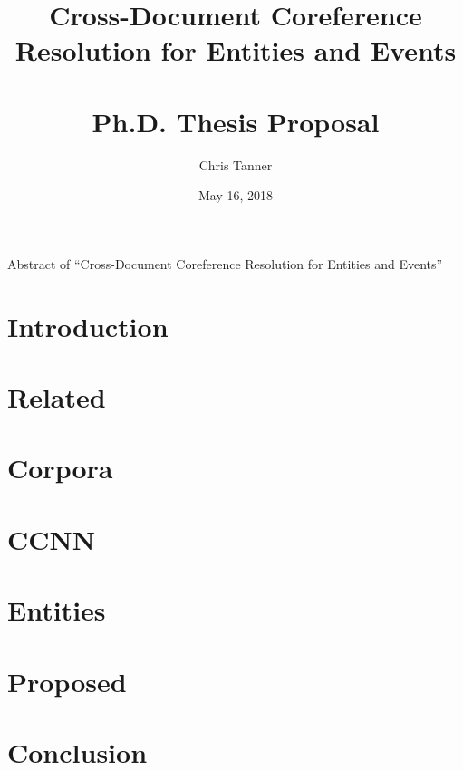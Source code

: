 \documentclass[10pt,oneside,openany]{brownthesis}
\begin{document}
\newcommand{\thesistitle}{Cross-Document Coreference Resolution for Entities and Events}
\author{Chris Tanner}
\title{\thesistitle\\~\\ Ph.D. Thesis Proposal}
\date{May 16, 2018}

\frontmatter %

\maketitle %

\mainmatter %


\def\abstract#1{\gdef\d@abstract{#1}}
\def\d@abstract{}
\def\abstractpage{%
  \thispagestyle{empty}
  \noindent Abstract of ``\thesistitle''
  \\
  
  \vfill}
\abstractpage
{
\singlespacing
\hypersetup{linkcolor=black}
\tableofcontents %
\doublespacing
}
\chapter{Introduction}


\chapter{Related}


\chapter{Corpora}


\chapter{CCNN}


\chapter{Entities}


\chapter{Proposed}


\chapter{Conclusion}

\backmatter %


\end{document}
